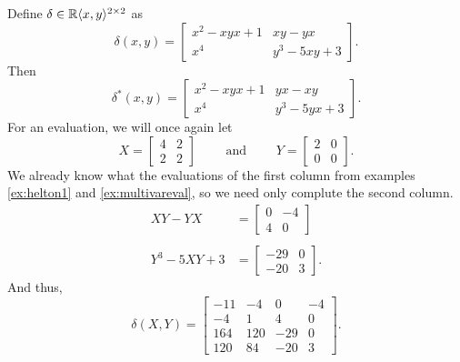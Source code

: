 \begin{example}
  Define \(\delta \in \mathbb{R} \langle x,y \rangle ^{2\times 2}\) as
  \[
    \delta(x,y) = \begin{bmatrix}
               x^2-xyx+1 & xy-yx \\
               x^4 & y^3-5xy+3
        \end{bmatrix}.
  \]
  Then
  \[
    \delta^*(x,y) = \begin{bmatrix}
               x^2-xyx+1 & yx-xy \\
               x^4 & y^3-5yx+3
        \end{bmatrix}.
  \]
  For an evaluation, we will once again let
  \[
    X = \begin{bmatrix} 4 &2\\2&2 \end{bmatrix}  \qquad \text{ and } \qquad Y =\begin{bmatrix} 2&0\\0&0 \end{bmatrix}.
  \]
  We already know what the evaluations of the first column from examples
  \ref{ex:helton1} and \ref{ex:multivareval}, so we need only complute the
  second column.
  \begin{align*}
    XY-YX &= \begin{bmatrix} 0&-4\\4&0 \end{bmatrix}  \\
    \\
    Y^3-5XY+3 &= \begin{bmatrix} -29&0\\-20&3 \end{bmatrix}.
  \end{align*}
  And thus,
  \[
    \delta(X,Y) =
    \begin{bmatrix}
      -11&-4&0&-4 \\
      -4&1&4&0 \\
      164&120&-29&0\\
      120&84&-20&3
    \end{bmatrix}.
  \]
\end{example}
